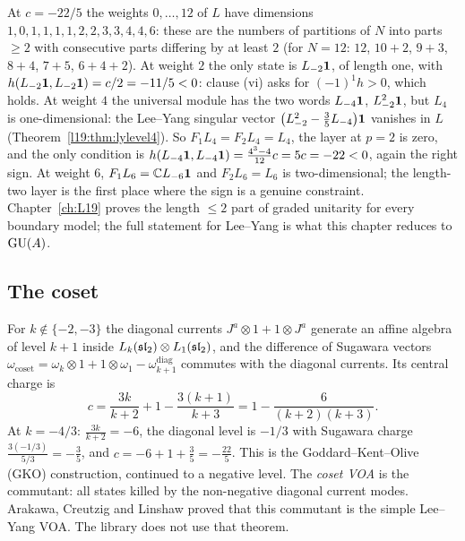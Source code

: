 \begin{example}\label{l28:ex:lylow}
At $c=-22/5$ the weights $0,\dots,12$ of $L$ have dimensions $1,0,1,1,1,1,2,2,3,3,4,4,6$: these are the numbers of
partitions of $N$ into parts $\ge2$ with consecutive parts differing by at least $2$ (for $N=12$: $12$, $10+2$, $9+3$,
$8+4$, $7+5$, $6+4+2$). At weight $2$ the only state is $L_{-2}\mathbf 1$, of length one, with
$h(L_{-2}\mathbf 1,L_{-2}\mathbf 1)=c/2=-11/5<0$: clause (vi) asks for $(-1)^1h>0$, which holds. At
weight $4$ the universal module has the two words $L_{-4}\mathbf 1$, $L_{-2}^2\mathbf 1$, but $L_4$ is
one-dimensional: the Lee--Yang singular vector $\bigl(L_{-2}^2-\tfrac35L_{-4}\bigr)\mathbf 1$ vanishes in $L$
(Theorem~\ref{l19:thm:lylevel4}). So $F_1L_4=F_2L_4=L_4$, the layer at $p=2$ is zero, and the only condition is
$h(L_{-4}\mathbf 1,L_{-4}\mathbf 1)=\tfrac{4^3-4}{12}c=5c=-22<0$, again the right sign. At weight $6$,
$F_1L_6={\mathbb{C}} L_{-6}\mathbf 1$ and $F_2L_6=L_6$ is two-dimensional; the length-two layer is the first place where
the sign is a genuine constraint. Chapter~\ref{ch:L19} proves the length $\le2$ part of graded unitarity for every
boundary model; the full statement for Lee--Yang is what this chapter reduces to $\mathrm{GU}(A)$.
\end{example}

\subsection{The coset}

For $k\notin\{-2,-3\}$ the diagonal currents $J^a\otimes1+1\otimes J^a$ generate an affine algebra of level $k+1$
inside $L_k(\mathfrak{sl}_2)\otimes L_1(\mathfrak{sl}_2)$, and the difference of Sugawara vectors
$\omega_{\mathrm{coset}}=\omega_k\otimes1+1\otimes\omega_1-\omega^{\mathrm{diag}}_{k+1}$ commutes with the diagonal
currents. Its central charge is
\begin{equation*}
c=\frac{3k}{k+2}+1-\frac{3(k+1)}{k+3}=1-\frac{6}{(k+2)(k+3)}.
\end{equation*}
At $k=-4/3$: $\tfrac{3k}{k+2}=-6$, the diagonal level is $-1/3$ with Sugawara charge $\tfrac{3(-1/3)}{5/3}=-\tfrac35$, and
$c=-6+1+\tfrac35=-\tfrac{22}5$. This is the Goddard--Kent--Olive (GKO) construction, continued to a negative level. The
\emph{coset VOA} is the commutant: all states killed by the non-negative diagonal current modes. Arakawa, Creutzig and
Linshaw proved that this commutant is the simple Lee--Yang VOA. The library does not use that theorem.

